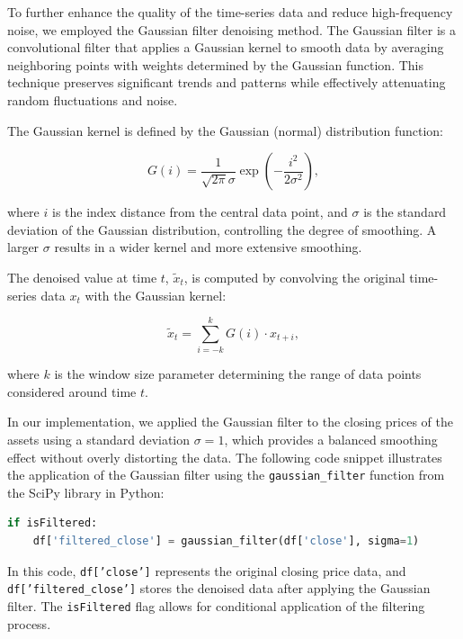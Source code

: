 To further enhance the quality of the time-series data and reduce high-frequency noise, we employed the Gaussian filter denoising method. The Gaussian filter is a convolutional filter that applies a Gaussian kernel to smooth data by averaging neighboring points with weights determined by the Gaussian function. This technique preserves significant trends and patterns while effectively attenuating random fluctuations and noise.

The Gaussian kernel is defined by the Gaussian (normal) distribution function:

\begin{equation}
G(i) = \frac{1}{\sqrt{2\pi} \sigma} \exp\left( -\frac{i^2}{2\sigma^2} \right),
\end{equation}

where $i$ is the index distance from the central data point, and $\sigma$ is the standard deviation of the Gaussian distribution, controlling the degree of smoothing. A larger $\sigma$ results in a wider kernel and more extensive smoothing.

The denoised value at time $t$, $\tilde{x}_t$, is computed by convolving the original time-series data $x_t$ with the Gaussian kernel:

\begin{equation}
\tilde{x}_t = \sum_{i = -k}^{k} G(i) \cdot x_{t + i},
\end{equation}

where $k$ is the window size parameter determining the range of data points considered around time $t$.

In our implementation, we applied the Gaussian filter to the closing prices of the assets using a standard deviation $\sigma = 1$, which provides a balanced smoothing effect without overly distorting the data. The following code snippet illustrates the application of the Gaussian filter using the \texttt{gaussian\_filter} function from the SciPy library in Python:

\begin{lstlisting}[language=Python]
if isFiltered:
    df['filtered_close'] = gaussian_filter(df['close'], sigma=1)
\end{lstlisting}

In this code, \texttt{df['close']} represents the original closing price data, and \texttt{df['filtered\_close']} stores the denoised data after applying the Gaussian filter. The \texttt{isFiltered} flag allows for conditional application of the filtering process.

